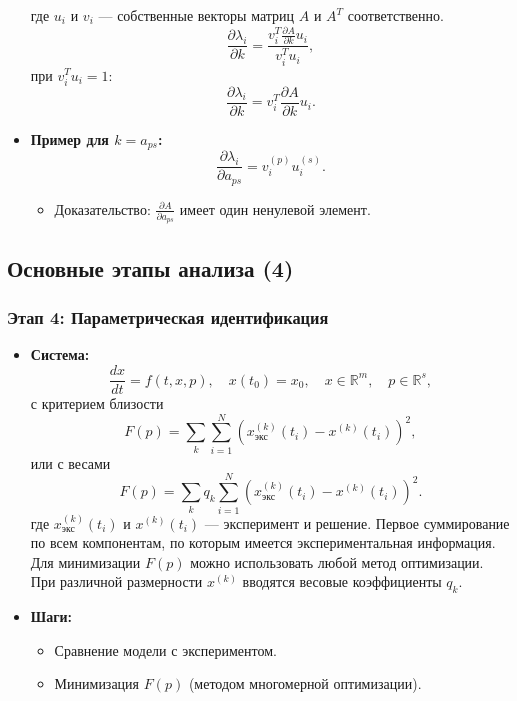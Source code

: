 \begin{itemize}[leftmargin=1em]
		где $u_i$ и $v_i$ — собственные векторы матриц $A$ и $A^T$ соответственно.
		\begin{equation}
			\frac{\partial \lambda_i}{\partial k} = \frac{v_i^T \frac{\partial A}{\partial k} u_i}{v_i^T u_i},
		\end{equation}
		при \(v_i^T u_i = 1\):
		\begin{equation}
			\frac{\partial \lambda_i}{\partial k} = v_i^T \frac{\partial A}{\partial k} u_i.
		\end{equation}
		\item \textbf{Пример для \(k = a_{ps}\):}
		\begin{equation}
			\frac{\partial \lambda_i}{\partial a_{ps}} = v_i^{(p)} u_i^{(s)}.
		\end{equation}
		\begin{itemize}
			\item Доказательство: \(\frac{\partial A}{\partial a_{ps}}\) имеет один ненулевой элемент.
		\end{itemize}
	\end{itemize}
	
	\subsection{Основные этапы анализа (4)}
	\subsubsection{Этап 4: Параметрическая идентификация}
	\begin{itemize}[leftmargin=1em]
		\item \textbf{Система:}
		\begin{equation}
			\frac{d x}{d t} = f(t, x, p), \quad x(t_0) = x_0, \quad x \in \mathbb{R}^m, \quad p \in \mathbb{R}^s,
		\end{equation}
		с критерием близости
		\begin{equation}
			F(p) = \sum_k \sum_{i=1}^N (x_{\text{экс}}^{(k)}(t_i) - x^{(k)}(t_i))^2,
		\end{equation}
		или с весами
		\begin{equation}
			F(p) = \sum_k q_k \sum_{i=1}^N (x_{\text{экс}}^{(k)}(t_i) - x^{(k)}(t_i))^2.
		\end{equation}
		где $x_{\text{экс}}^{(k)}(t_i)$ и $x^{(k)}(t_i)$ — эксперимент и решение. 
		\newline
		Первое суммирование по всем компонентам, по которым имеется экспериментальная информация. 
		\newline
		Для минимизации $F(p)$ можно использовать любой метод оптимизации. 
		\newline
		При различной размерности $x^{(k)}$ вводятся весовые коэффициенты $q_k$.
		\item \textbf{Шаги:}
		\begin{itemize}
			\item Сравнение модели с экспериментом.
			\item Минимизация \(F(p)\) (методом многомерной оптимизации).
		\end{itemize}
	\end{itemize}
	

